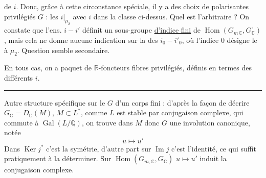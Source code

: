de $i$.  Donc, grâce à cette circonstance
spéciale, il y a des choix de  
polarisantes privilégiés  $G$ : les
$i|_{\mu_2}$ avec $i$ dans la classe ci-dessus.
Quel est l'arbitraire ? On constate que l'ens.
 $i-i'$  définit un
sous-groupe \uline{d'indice fini} de $\operatorname{Hom}(G_{m\,\mathbb C},G^\circ_{\mathbb C})$,
mais cela ne donne aucune indication sur la
 des $i_0-i'_0$, où l'indice $0$ désigne le
 à $\mu_2$. Question semble secondaire.

\margin{$\vert\!\vert\!\vert$}En tous cas, on a   paquet de
$\mathbb R$-foncteurs fibres privilégiés, définis en termes des
différents $i$.

\begin{center}\rule{2.2cm}{0.3pt}\end{center}

Autre structure spécifique sur le $G$ 
d'un corps fini : d'après la façon de
décrire $G_{\mathbb C}=D_{\mathbb C}(M)$, $M\subset L^*$, comme $L$ est
stable par conjugaison complexe, qui commute
à $\operatorname{Gal}(L/\mathbb Q)$, on trouve dans $M$ donc
$G$ une involution canonique, notée
\[
u\longmapsto u'
\]
Dans $\operatorname{Ker}j^*$ c'est la symétrie, d'autre part sur $\operatorname{Im}j$ c'est
l'identité, ce qui suffit pratiquement à la déterminer. Sur
$\operatorname{Hom}(G_{m,\mathbb C},G_{\mathbb C})$ $u\mapsto u'$ induit la conjugaison complexe.
